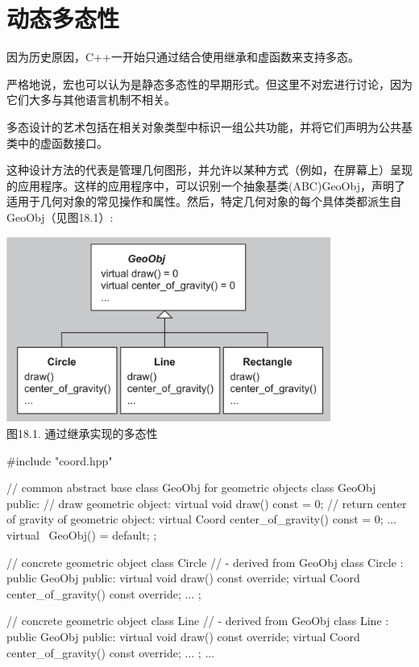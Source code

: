 \section{动态多态性}

因为历史原因，C++一开始只通过结合使用继承和虚函数来支持多态。

\begin{notice}
严格地说，宏也可以认为是静态多态性的早期形式。但这里不对宏进行讨论，因为它们大多与其他语言机制不相关。
\end{notice}

多态设计的艺术包括在相关对象类型中标识一组公共功能，并将它们声明为公共基类中的虚函数接口。

这种设计方法的代表是管理几何图形，并允许以某种方式（例如，在屏幕上）呈现的应用程序。这样的应用程序中，可以识别一个抽象基类(ABC)GeoObj，声明了适用于几何对象的常见操作和属性。然后，特定几何对象的每个具体类都派生自GeoObj（见图18.1）:

\begin{center}
\includegraphics[width=0.8\textwidth]{part3/ch18/images/1.png} \\
图18.1. 通过继承实现的多态性
\end{center}

\begin{cpp}
#include "coord.hpp"

// common abstract base class GeoObj for geometric objects
class GeoObj {
	public:
	// draw geometric object:
	virtual void draw() const = 0;
	// return center of gravity of geometric object:
	virtual Coord center_of_gravity() const = 0;
	...
	virtual ~GeoObj() = default;
};

// concrete geometric object class Circle
// - derived from GeoObj
class Circle : public GeoObj {
	public:
	virtual void draw() const override;
	virtual Coord center_of_gravity() const override;
	...
};

// concrete geometric object class Line
// - derived from GeoObj
class Line : public GeoObj {
	public:
	virtual void draw() const override;
	virtual Coord center_of_gravity() const override;
	...
};
...
\end{cpp}

